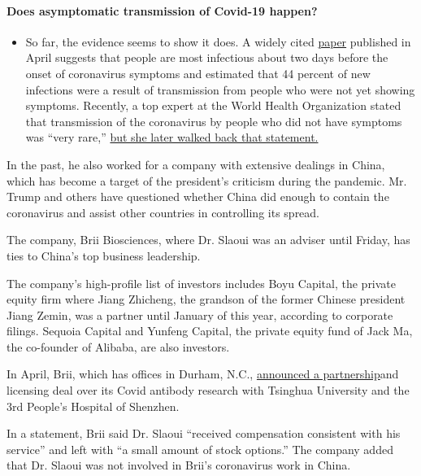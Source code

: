 \begin{itemize}
{  \paragraph{Does asymptomatic transmission of Covid-19
  happen?}\label{does-asymptomatic-transmission-of-covid-19-happen}}

  \begin{itemize}
  \tightlist
  \item
    So far, the evidence seems to show it does. A widely cited
    \href{https://www.nature.com/articles/s41591-020-0869-5}{paper}
    published in April suggests that people are most infectious about
    two days before the onset of coronavirus symptoms and estimated that
    44 percent of new infections were a result of transmission from
    people who were not yet showing symptoms. Recently, a top expert at
    the World Health Organization stated that transmission of the
    coronavirus by people who did not have symptoms was ``very rare,''
    \href{https://www.nytimes3xbfgragh.onion/2020/06/09/world/coronavirus-updates.html?action=click\&pgtype=Article\&state=default\&region=MAIN_CONTENT_3\&context=storylines_faq\#link-1f302e21}{but
    she later walked back that statement.}
  \end{itemize}
\end{itemize}

In the past, he also worked for a company with extensive dealings in
China, which has become a target of the president's criticism during the
pandemic. Mr. Trump and others have questioned whether China did enough
to contain the coronavirus and assist other countries in controlling its
spread.

The company, Brii Biosciences, where Dr. Slaoui was an adviser until
Friday, has ties to China's top business leadership.

The company's high-profile list of investors includes Boyu Capital, the
private equity firm where Jiang Zhicheng, the grandson of the former
Chinese president Jiang Zemin, was a partner until January of this year,
according to corporate filings. Sequoia Capital and Yunfeng Capital, the
private equity fund of Jack Ma, the co-founder of Alibaba, are also
investors.

In April, Brii, which has offices in Durham, N.C.,
\href{https://www.briibio.com/news/45.html}{announced a partnership}and
licensing deal over its Covid antibody research with Tsinghua University
and the 3rd People's Hospital of Shenzhen.

In a statement, Brii said Dr. Slaoui ``received compensation consistent
with his service'' and left with ``a small amount of stock options.''
The company added that Dr. Slaoui was not involved in Brii's coronavirus
work in China.

